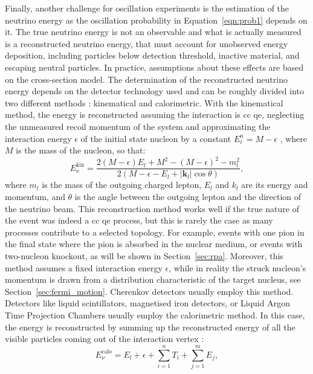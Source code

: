 Finally, another challenge for oscillation experiments is the estimation of the neutrino energy as the oscillation probability in Equation~\eqref{eqn:prob1} depends on it. The true neutrino energy is not an observable and what is actually measured is a reconstructed neutrino energy, that must account for unobserved energy deposition, including particles below detection threshold, inactive material, and escaping neutral particles.
In practice, assumptions about these effects are based on the cross-section model. 
The determination of the reconstructed neutrino energy depends on the detector technology used and can be roughly divided into two different methods \cite{nustec}: kinematical and calorimetric.
With the kinematical method, the energy is reconstructed assuming the interaction is \acrshort{cc} \acrfull{qe}, neglecting the unmeasured recoil momentum of the system and approximating the interaction energy $\epsilon$ of the initial state nucleon by a constant $E_i^n = M - \epsilon$ \cite{bodek}, where $M$ is the mass of the nucleon, so that:
\begin{equation}
E_\nu^\text{kin} = \frac{2(M-\epsilon)E_l + M^2 - (M-\epsilon)^2-m_l^2}{2(M-\epsilon - E_l+|\mathbf{k}_l|\cos\theta)},
\end{equation}
where $m_l$ is the mass of the outgoing charged lepton, $E_l$ and $k_l$ are its energy and momentum, and $\theta$ is the angle between the outgoing lepton and the direction of the neutrino beam.
This reconstruction method works well if the true nature of the event was indeed a \acrshort{cc} \acrshort{qe} process, but this is rarely the case as many processes contribute to a selected topology. For example, events with one pion in the final state where the pion is absorbed in the nuclear medium, or events with two-nucleon knockout, as will be shown in Section~\ref{sec:rpa}. Moreover, this method assumes a fixed interaction energy $\epsilon$, while in reality the struck nucleon's momentum is drawn from a distribution characteristic of the target nucleus, see Section~\ref{sec:fermi_motion}.
Cherenkov detectors usually employ this method.
Detectors like liquid scintillators, magnetised iron detectors, or Liquid Argon Time Projection Chambers usually employ the calorimetric method. In this case, the energy is reconstructed by summing up the reconstructed energy of all the visible particles coming out of the interaction vertex \cite{nustec}:
\begin{equation}
E_\nu^\text{calo} = E_l + \epsilon + \sum_{i=1}^n T_i + \sum_{j=1}^m E_j,
\end{equation}
